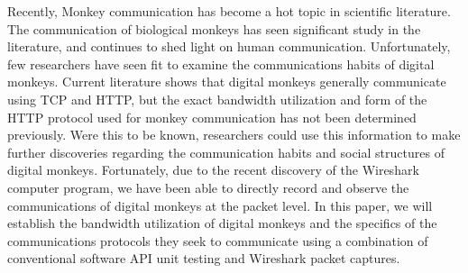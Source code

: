 Recently, Monkey communication has become a hot topic in scientific literature.
The communication of biological monkeys has seen significant study in the literature,
and continues to shed light on human communication.
Unfortunately, few researchers have seen fit to examine the communications habits of digital
monkeys.
Current literature\cite{sub_verif_plan} shows that digital monkeys generally communicate using
TCP and HTTP, but the exact bandwidth utilization and form of the HTTP protocol used for monkey
communication has not been determined previously.
Were this to be known, researchers could use this information to make further discoveries
regarding the communication habits and social structures of digital monkeys.
Fortunately, due to the recent discovery of the Wireshark computer program, we have been able
to directly record and observe the communications of digital monkeys at the packet level.
In this paper, we will establish the bandwidth utilization of digital monkeys and the specifics
of the communications protocols they seek to communicate using a combination of conventional
software API unit testing and Wireshark packet captures.